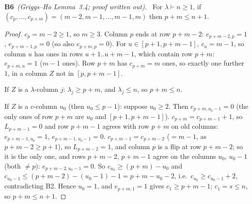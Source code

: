 \documentclass[11pt]{article}
\newcommand{\step}[2]{\par\medskip\noindent\textbf{#1}\ \textit{#2}\ }
\begin{document}
\step{B6}{(Griggs--Ho Lemma~3.4; proof written out).} For $\lambda\vdash n\ge1$, if $(c_p,\ldots,c_{p+m})=(m-2,m-1,\ldots,m-1,m)$ then $p+m\le n+1$.
\begin{proof} $c_p=m-2\ge1$, so $m\ge3$. Column $p$ ends at row $p+m-2$: $e_{p+m-2,p}=1$, $e_{p+m-1,p}=0$ (so also $e_{p+m,p}=0$). For $u\in[p+1,p+m-1]$, $c_u=m-1$, so column $u$ has ones in rows $u+1..u+m-1$, which contain row $p+m$: $e_{p+m,u}=1$ ($m-1$ ones). Row $p+m$ has $c_{p+m}=m$ ones, so exactly one further $1$, in a column $Z$ not in $[p,p+m-1]$.

If $Z$ is a $\lambda$-column $j$: $\lambda_j\ge p+m$, and $\lambda_j\le n$, so $p+m\le n$.

If $Z$ is a $c$-column $u_0$ (then $u_0\le p-1$): suppose $u_0\ge2$. Then $e_{p+m,u_0-1}=0$ (the only ones of row $p+m$ are $u_0$ and $[p+1,p+m-1]$). $c_{p+m}=c_{p+m-1}+1$, so $L_{p+m-1}=0$ and row $p+m-1$ agrees with row $p+m$ on old columns: $e_{p+m-1,u_0}=1$, $e_{p+m-1,u_0-1}=0$. $c_{p+m-1}=c_{p+m-2}$ ($=m-1$, as $p+m-2\ge p+1$), so $L_{p+m-2}=1$, and column $p$ is a flip at row $p+m-2$; so it is the only one, and rows $p+m-2$, $p+m-1$ agree on the columns $u_0$, $u_0-1$ (both $\ne p$): $e_{p+m-2,u_0-1}=0$. So $c_{u_0}\ge(p+m)-u_0$ and $c_{u_0-1}\le(p+m-2)-(u_0-1)-1=p+m-u_0-2$, i.e.\ $c_{u_0}\ge c_{u_0-1}+2$, contradicting B2. Hence $u_0=1$, and $e_{p+m,1}=1$ gives $c_1\ge p+m-1$; $c_1=s\le n$, so $p+m\le n+1$.
\end{proof}
\end{document}
